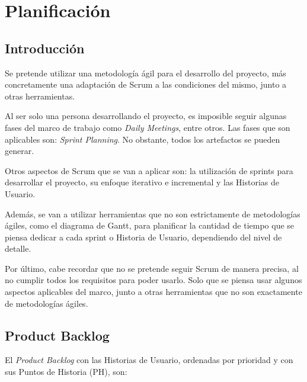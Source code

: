 \chapter{Planificación}

\section{Introducción}

Se pretende utilizar una metodología ágil para el desarrollo del proyecto, más concretamente una adaptación de Scrum a las condiciones del mismo, junto a otras herramientas.

\bigskip
Al ser solo una persona desarrollando el proyecto, es imposible seguir algunas fases del marco de trabajo como \textit{Daily Meetings}, entre otros. Las fases que son aplicables son: \textit{Sprint Planning}. No obstante, todos los artefactos se pueden generar.

\bigskip

Otros aspectos de Scrum que se van a aplicar son: la utilización de sprints para desarrollar el proyecto, su enfoque iterativo e incremental y las Historias de Usuario.

\bigskip

Además, se van a utilizar herramientas que no son estrictamente de metodologías ágiles, como el diagrama de Gantt, para planificar la cantidad de tiempo que se piensa dedicar a cada sprint o Historia de Usuario, dependiendo del nivel de detalle. 

\bigskip

Por último, cabe recordar que no se pretende seguir Scrum de manera precisa, al no cumplir todos los requisitos para poder usarlo. Solo que se piensa usar algunos aspectos aplicables del marco, junto a otras herramientas que no son exactamente de metodologías ágiles.


\section{Product Backlog}

El \textit{Product Backlog} con las Historias de Usuario, ordenadas por prioridad y con sus Puntos de Historia (PH), son:

